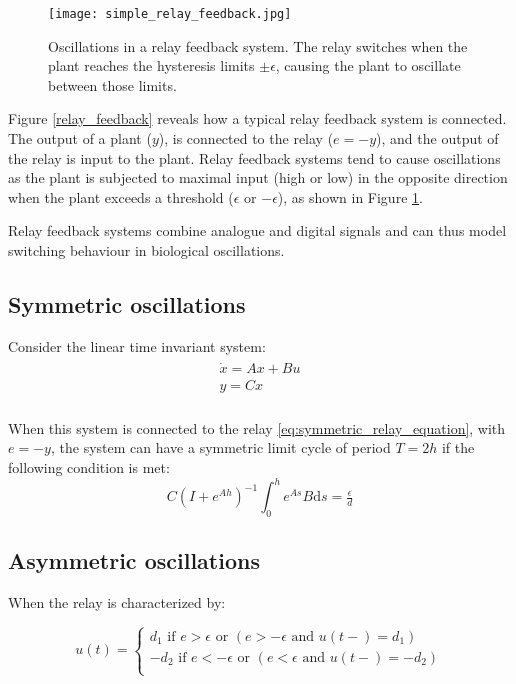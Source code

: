 \documentclass[a4paper, 12pt]{article}
\begin{document}
\begin{figure}[h!]
\texttt{[image: simple\_relay\_feedback.jpg]}
\caption{Oscillations in a relay feedback system. The relay switches when the plant reaches the hysteresis limits $\pm \epsilon$, causing the plant to oscillate between those limits.}
\label{relay_feedback_oscillations}
\end{figure}
\color{black}


Figure \ref{relay_feedback} reveals how a typical relay feedback system is connected. The output of a plant ($y$), is connected to the relay ($e = -y$), and the output of the relay is input to the plant. Relay feedback systems tend to cause oscillations as the plant is subjected to maximal input (high or low) in the opposite direction when the plant exceeds a threshold ($\epsilon$ or $-\epsilon$), as shown in  Figure \ref{relay_feedback_oscillations}.

Relay feedback systems combine analogue and digital signals and can thus model switching behaviour in biological oscillations.

\subsection{Symmetric oscillations}
Consider the linear time invariant system:
\begin{eqnarray}
\begin{array}{l}
\displaystyle \dot{x} = Ax + Bu \\
\displaystyle y = Cx \\
\end{array}
\label{LTIsystem}
\end{eqnarray}

When this system is connected to the relay \ref{eq:symmetric_relay_equation}, with $e = -y$, the system can have a symmetric limit cycle of period $T=2h$ if the following condition is met:
\begin{equation}
C(I+e^{Ah})^{-1}\int_0^he^{As}B\text{d}s = \tfrac{\epsilon}{d}
\label{eq:2_3}
\end{equation}

\subsection{Asymmetric oscillations}\label{sec:asymm_oscillations}

When the relay is characterized by:

\begin{equation}
	u(t)=\begin{cases}
	               d_1 \text{ if } e > \epsilon \text{ or } (e >-\epsilon \text{ and } u(t-) = d_1)\\
	                -d_2 \text{ if } e < -\epsilon \text{ or } (e < \epsilon \text{ and } u(t-) = -d_2)\\
	              
	            \end{cases}
                \label{asymmetric_relay_equation}
\end{equation}
\end{document}
